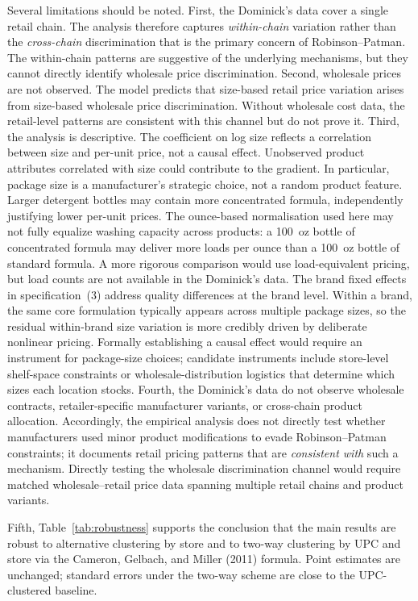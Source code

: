 \documentclass[12pt]{article}
\theoremstyle{definition}
\begin{document}
Several limitations should be noted.
First, the Dominick's data cover a single retail chain. The analysis therefore captures \textit{within-chain} variation rather than the \textit{cross-chain} discrimination that is the primary concern of Robinson--Patman.
The within-chain patterns are suggestive of the underlying mechanisms, but they cannot directly identify wholesale price discrimination.
Second, wholesale prices are not observed.
The model predicts that size-based retail price variation arises from size-based wholesale price discrimination. Without wholesale cost data, the retail-level patterns are consistent with this channel but do not prove it.
Third, the analysis is descriptive.
The coefficient on log size reflects a correlation between size and per-unit price, not a causal effect.
Unobserved product attributes correlated with size could contribute to the gradient.
In particular, package size is a manufacturer's strategic choice, not a random product feature. Larger detergent bottles may contain more concentrated formula, independently justifying lower per-unit prices. The ounce-based normalisation used here may not fully equalize washing capacity across products: a 100~oz bottle of concentrated formula may deliver more loads per ounce than a 100~oz bottle of standard formula. A more rigorous comparison would use load-equivalent pricing, but load counts are not available in the Dominick's data. The brand fixed effects in specification~(3) address quality differences at the brand level. Within a brand, the same core formulation typically appears across multiple package sizes, so the residual within-brand size variation is more credibly driven by deliberate nonlinear pricing. Formally establishing a causal effect would require an instrument for package-size choices; candidate instruments include store-level shelf-space constraints or wholesale-distribution logistics that determine which sizes each location stocks.
Fourth, the Dominick's data do not observe wholesale contracts, retailer-specific manufacturer variants, or cross-chain product allocation. Accordingly, the empirical analysis does not directly test whether manufacturers used minor product modifications to evade Robinson--Patman constraints; it documents retail pricing patterns that are \textit{consistent with} such a mechanism. Directly testing the wholesale discrimination channel would require matched wholesale--retail price data spanning multiple retail chains and product variants.

Fifth, Table~\ref{tab:robustness} supports the conclusion that the main results are robust to alternative clustering by store and to two-way clustering by UPC and store via the Cameron, Gelbach, and Miller (2011) formula. Point estimates are unchanged; standard errors under the two-way scheme are close to the UPC-clustered baseline.
\end{document}

